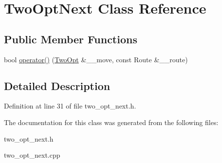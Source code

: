 \hypertarget{classTwoOptNext}{
\section{Two\-Opt\-Next Class Reference}
\label{classTwoOptNext}
}
\subsection*{Public Member Functions}
\begin{CompactItemize}
\item 
\hypertarget{classTwoOptNext_baf229b2e056f39ab971cf2ac66a833e}{
bool \hyperlink{classTwoOptNext_baf229b2e056f39ab971cf2ac66a833e}{operator()} (\hyperlink{classTwoOpt}{Two\-Opt} \&\_\-\_\-move, const Route \&\_\-\_\-route)}
\label{classTwoOptNext_baf229b2e056f39ab971cf2ac66a833e}

\end{CompactItemize}


\subsection{Detailed Description}




Definition at line 31 of file two\_\-opt\_\-next.h.

The documentation for this class was generated from the following files:\begin{CompactItemize}
\item 
two\_\-opt\_\-next.h\item 
two\_\-opt\_\-next.cpp\end{CompactItemize}
